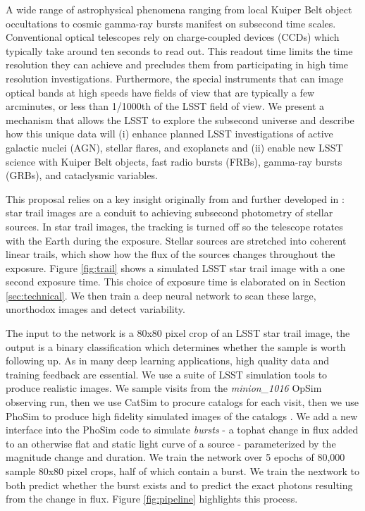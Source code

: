 \documentclass[12pt, letterpaper]{article}
\begin{document}
A wide range of astrophysical phenomena ranging from local Kuiper Belt object occultations to cosmic gamma-ray bursts manifest on subsecond time scales. Conventional optical telescopes rely on charge-coupled devices (CCDs) which typically take around ten seconds to read out. This readout time limits the time resolution they can achieve and precludes them from participating in high time resolution investigations. Furthermore, the special instruments that can image optical bands at high speeds have fields of view that are typically a few arcminutes, or less than 1/1000th of the LSST field of view. We present a mechanism that allows the LSST to explore the subsecond universe and describe how this unique data will (i) enhance planned LSST investigations of active galactic nuclei (AGN), stellar flares, and exoplanets and (ii) enable new LSST science with Kuiper Belt objects, fast radio bursts (FRBs), gamma-ray bursts (GRBs), and cataclysmic variables.

This proposal relies on a key insight originally from \cite{1986PASP...98..802H} and further developed in \cite{mine}: star trail images are a conduit to achieving subsecond photometry of stellar sources. In star trail images, the tracking is turned off so the telescope rotates with the Earth during the exposure. Stellar sources are stretched into coherent linear trails, which show how the flux of the sources changes throughout the exposure. Figure \ref{fig:trail} shows a simulated LSST star trail image with a one second exposure time. This choice of exposure time is elaborated on in Section \ref{sec:technical}. We then train a deep neural network to scan these large, unorthodox images and detect variability.

The input to the network is a 80x80 pixel crop of an LSST star trail image, the output is a binary classification which determines whether the sample is worth following up. As in many deep learning applications, high quality data and training feedback are essential. We use a suite of LSST simulation tools to produce realistic images. We sample visits from the \textit{minion\_1016} OpSim observing run, then we use CatSim to procure catalogs for each visit, then we use PhoSim to produce high fidelity simulated images of the catalogs \citep{2014SPIE.9150E..15D,2014SPIE.9150E..14C,2015ApJS..218...14P}. We add a new interface into the PhoSim code to simulate \textit{bursts} - a tophat change in flux added to an otherwise flat and static light curve of a source - parameterized by the magnitude change and duration. We train the network over 5 epochs of 80,000 sample 80x80 pixel crops, half of which contain a burst. We train the nextwork to both predict whether the burst exists and to predict the exact photons resulting from the change in flux. Figure \ref{fig:pipeline} highlights this process. 
\end{document}
